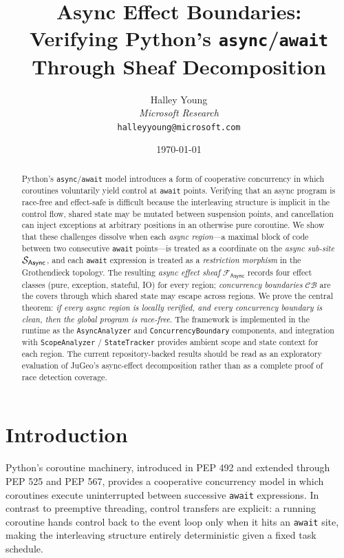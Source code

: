 \documentclass[11pt]{article}
\title{\textbf{Async Effect Boundaries:\\
       Verifying Python's \texttt{async}/\texttt{await}\\
       Through Sheaf Decomposition}}
\author{%
  Halley Young\\
  \textit{Microsoft Research}\\
  \texttt{halleyyoung@microsoft.com}
}
\date{\today}
\newcommand{\Async}{\mathsf{Async}}          %
\newcommand{\CB}{\mathcal{CB}}               %
\newcommand{\asyncSite}{\Site_{\Async}}      %
\newcommand{\asyncSheaf}{\mathcal{F}_{\Async}} %
\begin{document}
\maketitle

\begin{abstract}
Python's \texttt{async}/\texttt{await} model introduces a form of cooperative
concurrency in which coroutines voluntarily yield control at \texttt{await}
points.  Verifying that an async program is race-free and effect-safe is
difficult because the interleaving structure is implicit in the control flow,
shared state may be mutated between suspension points, and cancellation
can inject exceptions at arbitrary positions in an otherwise pure coroutine.
We show that these challenges dissolve when each \emph{async region}---a
maximal block of code between two consecutive \texttt{await} points---is
treated as a coordinate on the \emph{async sub-site} $\asyncSite$, and each
\texttt{await} expression is treated as a \emph{restriction morphism} in the
Grothendieck topology.  The resulting \emph{async effect sheaf} $\asyncSheaf$
records four effect classes (pure, exception, stateful, IO) for every region;
\emph{concurrency boundaries} $\CB$ are the covers through which shared state
may escape across regions.  We prove the central theorem:
\emph{if every async region is locally verified, and every concurrency boundary
is clean, then the global program is race-free}.
The framework is implemented in the \JuGeo{} \Python{} runtime as the
\texttt{AsyncAnalyzer} and \texttt{ConcurrencyBoundary} components, and
integration with \texttt{ScopeAnalyzer} / \texttt{StateTracker} provides
ambient scope and state context for each region.
The current repository-backed results should be read as an exploratory
evaluation of JuGeo's async-effect decomposition rather than as a
complete proof of race detection coverage.
\end{abstract}

\bigskip

\section{Introduction}\label{sec:intro}

Python's coroutine machinery, introduced in PEP 492 and extended through
PEP 525 and PEP 567, provides a cooperative concurrency model in which
coroutines execute uninterrupted between successive \texttt{await}
expressions.  In contrast to preemptive threading, control transfers are
explicit: a running coroutine hands control back to the event loop only
when it hits an \texttt{await} site, making the interleaving structure
entirely deterministic given a fixed task schedule.
\end{document}
